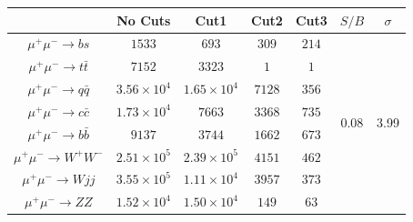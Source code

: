 \documentclass[a4paper,11pt]{article}
\begin{document}
\begin{center}
\begin{table}
  \begin{center}
  \begin{tabular}{|c|c|c|c|c|c|c|}
  \hline
  &  No Cuts  &     Cut1 & Cut2 & Cut3 & $S/B$ &  $\sigma$  \\
  \hline
  $\mu^+\mu^-\to bs$     &   $1533$  &   $693$  &  $309$ & $214$   &   \multirow{8}{*}{0.08}   &  \multirow{8}{*}{3.99}  \\
  $\mu^+\mu^-\to t\bar{t}$     &   $7152$    & $3323$   &  $1$  & $1$  & & \\
  $\mu^+\mu^-\to q\bar{q}$     &   $3.56\times{10^4}$    &   $1.65\times{10^4}$ & $7128$    &  $356$ &   &  \\
  $\mu^+\mu^-\to c\bar{c}$     &   $1.73\times{10^4}$   &    $7663$ & $3368$    &  $735$  &   &  \\
  $\mu^+\mu^-\to b\bar{b}$     &   $9137$    &  $3744$ &   $1662$    &  $673$  &   &  \\
  $\mu^+\mu^-\to W^+W^-$  & $2.51\times{10^5}$     &  $2.39\times{10^5}$ &  $4151$ &  $462$ & & \\
  $\mu^+\mu^-\to Wjj$  & $3.55\times{10^5}$   & $1.11\times{10^4}$  &  $3957$   &  $373$  & & \\
  $\mu^+\mu^-\to ZZ$  & $1.52\times{10^4}$  & $1.50\times{10^4}$ &  $149$   &  $63$  &  & \\

\end{tabular}
\end{center}
\end{table}
\end{center}
\end{document}

